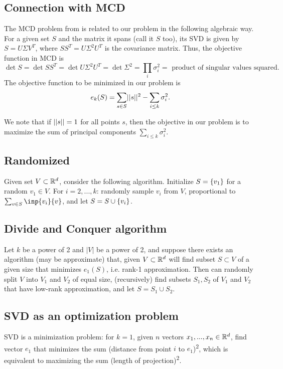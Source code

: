 \documentclass{article}
\begin{document}
\subsection{Connection with MCD}
The MCD problem from \cite{bernholt2004complexity} is related to our problem in the following algebraic way. For a given set $S$ and the matrix it spans (call it $S$ too), its SVD is given by $S = U \Sigma V^T$, where $SS^T = U \Sigma^2 U^T$ is the covariance matrix. Thus, the objective function in MCD is $$\det{S} = \det{SS^T} = \det{U \Sigma^2 U^T} = \det{\Sigma^2} = \prod_{i}\sigma_i^2 = \text{ product of singular values squared}.$$ The objective function to be minimized in our problem is $$e_k(S) = \sum_{s\in S}\norm{s}^2 - \sum_{i\leq k}\sigma_i^2.$$

We note that if $||s|| = 1$ for all points $s$, then the objective in our problem is to maximize the sum of principal components $\sum_{i\leq k}\sigma_i^2$.

\subsection{Randomized}
Given set $V \subset \mathbb{R}^d$, consider the following algorithm.
Initialize $S = \left\{v_1\right\}$ for a random $v_1\in V$. For $i=2,...,k$: randomly sample $v_i$ from $V$, proportional to $\sum_{v\in S}\inp{v_i}{v}$, and let $S = S\cup \left\{v_i\right\}$.

\subsection{Divide and Conquer algorithm}
Let $k$ be a power of 2 and $|V|$ be a power of 2, and suppose there exists an algorithm (may be approximate) that, given $V\subset \mathbb{R}^d$ will find subset $S\subset V$ of a given size that minimizes $e_1(S)$, i.e. rank-1 approximation. Then can randomly split $V$ into $V_1$ and $V_2$ of equal size, (recursively) find subsets $S_1,S_2$ of $V_1$ and $V_2$ that have low-rank approximation, and let $S = S_1\cup S_2$.

\subsection{SVD as an optimization problem}
SVD is a minimization problem: for $k=1$, given $n$ vectors $x_1,...,x_n\in \mathbb{R}^d$, find vector $e_1$ that minimizes the sum (distance from point $i$ to $e_1$)\textsuperscript{2}, which is equivalent to maximizing the sum (length of projection)\textsuperscript{2}.
\end{document}
